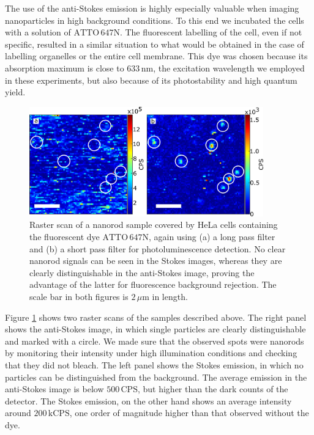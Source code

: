 \documentclass[journal=nalefd,manuscript=letter]{achemso}
\newcommand{\nm}{\ensuremath{\,\textrm{nm}}}
\newcommand{\um}{\ensuremath{\,\mu\textrm{m}}}
\newcommand{\CPS}{\ensuremath{\,\textrm{CPS}}}
\newcommand{\kCPS}{\ensuremath{\,\textrm{kCPS}}}
\newcommand{\atto}{\ensuremath{\textrm{ATTO}\,647\textrm{N}}}
\begin{document}
The use of the anti-Stokes emission is highly especially valuable when imaging
nanoparticles in high background conditions. To this end we incubated the cells
with a solution of $\atto$. The fluorescent labelling of the cell, even if not
specific, resulted in a similar situation to what would be obtained in the case
of labelling organelles or the entire cell membrane. This dye was chosen because
its absorption maximum is close to $633\nm$, the excitation wavelength we
employed in these experiments, but also because of its photostability and high
quantum yield.

\begin{figure}[htp] \centering
\includegraphics[width=0.9\textwidth]{Figures/05_Stokes_AS_with_dye/stokes_as_with_dye.png}
\caption{Raster scan of a nanorod sample covered by HeLa cells containing the
fluorescent dye $\atto$, again using (a) a long pass filter and (b) a short pass
filter for photoluminescence detection. No clear nanorod signals can be seen in
the Stokes images, whereas they are clearly distinguishable in the anti-Stokes
image, proving the advantage of the latter for fluorescence background
rejection. The scale bar in both figures is $2\um$ in length.}
	\label{fig:Stokes_AS_with_dye}
\end{figure}

Figure \ref{fig:Stokes_AS_with_dye} shows two raster scans of the samples
described above. The right panel shows the anti-Stokes image, in which single
particles are clearly distinguishable and marked with a circle. We made sure
that the observed spots were nanorods by monitoring their intensity under high
illumination conditions and checking that they did not bleach. The left panel
shows the Stokes emission, in which no particles can be distinguished from the
background. The average emission in the anti-Stokes image is below $500\CPS$,
but higher than the dark counts of the detector. The Stokes emission, on the
other hand shows an average intensity around $200\kCPS$, one order of magnitude
higher than that observed without the dye.
\end{document}
